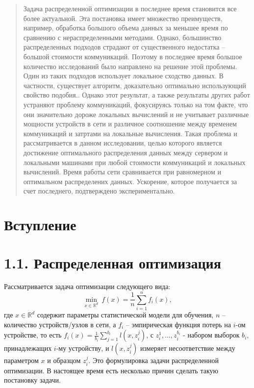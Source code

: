\documentclass{article}
\theoremstyle{definition}
\theoremstyle{plain}
\begin{document}
\begin{abstract}
Задача распределенной оптимизации в последнее время становится все более актуальной. Эта постановка имеет множество преимуществ, например, обработка большого объема данных за меньшее время по сравнению с нераспределенными методами. Однако, большинство распределенных подходов страдают от существенного недостатка -- большой стоимости коммуникаций. Поэтому в последнее время большое количество исследований было направлено на решение этой проблемы. Один из таких подходов использует локальное сходство данных. В частности, существует алгоритм, доказательно оптимально использующий свойство подобия.. Однако этот результат, а также результаты других работ устраняют проблему коммуникаций, фокусируясь только на том факте, что они значительно дороже локальных вычислений и не учитывает различные мощности устройств в сети и различное соотношение между временем коммуникаций и затртами на локальные вычисления. Такая проблема и рассматривается в данном исследовании, целью которого является достижение оптимального распределения данных между сервером и локальными машинами при любой стоимости коммуникаций и локальных вычислений. Время работы сети сравнивается при равномерном и оптимальном распределених данных. Ускорение, которое получается за счет последнего, подтверждено экспериментально.
\end{abstract}


\section{Вступление}

\section*{1.1. Распределенная оптимизация}

Рассматривается задача оптимизации следующего вида:
\begin{equation}
    \label{eq:1}
    \underset{x\in \mathbb{R}^d}{\min} ~ f(x) = \frac{1}{n} \sum \limits_{i = 1}^{n} f _i(x),
\end{equation}
где $x\in\mathbb{R}^d$ содержит параметры статистической модели для обучения, $n$ -- количество устройств/узлов в сети, а $f_i$ -- эмпирическая функция потерь на $i$-ом устройстве, то есть $f_i(x) = \frac{1}{b_i}\sum_{j = 1}^{b_i} l(x, z_i^j)$, с $z_i^1, \ldots ,z_i^{b_i}$ - набором выборок $b_i$, принадлежащих $i$-му устройству, и $l(x, z_i^j)$ измеряет несоответствие между параметром $x$ и образцом $z_i^j$. Это формулировка задачи распределенной оптимизации. В настоящее время есть несколько причин сделать такую постановку задачи.
\end{document}
